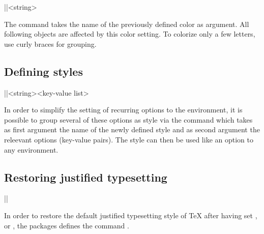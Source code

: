 \documentclass[a4paper]{article}
\begin{document}
\begin{macrodef}
|\leporellocolorselect|{<string>}
\end{macrodef}
The command \macro{\leporellocolorselect} takes the name of the previously defined color as argument. All following objects are affected by this color setting. To colorize only a few letters, use curly braces for grouping.

\subsection{Defining styles}

\begin{macrodef}
|\leporellosetstyle|{<string>}{<key-value list>}
\end{macrodef}
In order to simplify the setting of recurring options to the  environment, it is possible to group several of these options as style via the \macro{\leporellosetstyle} command which takes as first argument the name of the newly defined style and as second argument the releevant options (key-value pairs). The style can then be used like an option to any  environment.

\subsection{Restoring justified typesetting}

\begin{macrodef}
|\leporellojustified|
\end{macrodef}
In order to restore the default justified typesetting style of TeX after having set \macro{\raggedright}, \macro{\raggedleft} or \macro{\centering}, the packages defines the command \macro{\leporellojustified}.


\printchanges
\end{document}
